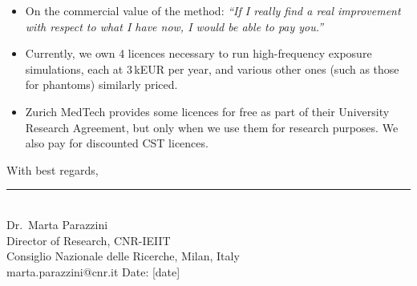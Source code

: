 \documentclass[11pt]{article}
\begin{document}
\begin{itemize}[leftmargin=1.4em,itemsep=0.5em]
  \item On the commercial value of the method: \textit{``If I really find a real improvement
  with respect to what I have now, I would be able to pay you.''}

  \item Currently, we own 4 licences necessary to run high-frequency exposure simulations,
  each at 3\,kEUR per year, and various other ones (such as those for phantoms) similarly
  priced.

  \item Zurich MedTech provides some licences for free as part of their University Research
  Agreement, but only when we use them for research purposes. We also pay for discounted CST
  licences.

\end{itemize}

\vspace{1.5em}
With best regards,

\vspace{2.2cm}

\rule{6cm}{0.4pt}\\
Dr.\ Marta Parazzini\\
Director of Research, CNR-IEIIT\\
Consiglio Nazionale delle Ricerche, Milan, Italy\\
marta.parazzini@cnr.it \hfill Date: [date]
\end{document}
